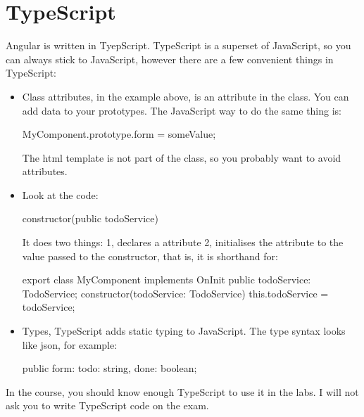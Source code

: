 \section{TypeScript}
Angular is written in TyepScript. TypeScript is a superset of JavaScript, so you can always stick to JavaScript, however there are a few convenient things in TypeScript:
\begin{itemize}
\item Class attributes, in the example above,  is an attribute in the  class. You can add data to your prototypes. The JavaScript way to do the same thing is: 
\begin{Code}
MyComponent.prototype.form = someValue;
\end{Code}
The html template is not part of the class, so you probably want to avoid  attributes.
\item Look at the code: 
\begin{Code}
constructor(public todoService) { }
\end{Code}
It does two things: 1, declares a  attribute 2, initialises the attribute to the value passed to the constructor, that is, it is shorthand for:
\begin{Code}
export class MyComponent implements OnInit {
  public todoService: TodoService;
  constructor(todoService: TodoService) { 
    this.todoService = todoService;
  }
}
\end{Code}
\item Types, TypeScript adds static typing to JavaScript. The type syntax looks like json, for example:
\begin{Code}
public form: {todo: string, done: boolean};
\end{Code}
\end{itemize}
In the course, you should know enough TypeScript to use it in the labs. I will not ask you to write TypeScript code on the exam.

